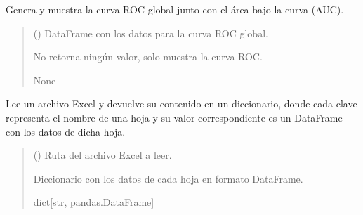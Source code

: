 \documentclass[letterpaper,10pt,spanish]{sphinxmanual}
\begin{document}
\begin{fulllineitems}
\label{\detokenize{Funciones_Visualizacion:leer_metricas.plot_roc_curves}}
\pysigstartsignatures
\pysiglinewithargsret
{}
{}
{}
\pysigstopsignatures
\sphinxAtStartPar
Genera y muestra la curva ROC global junto con el área bajo la curva (AUC).
\begin{quote}\begin{description}
\sphinxAtStartPar
{} () \textendash{} DataFrame con los datos para la curva ROC global.

\sphinxAtStartPar
No retorna ningún valor, solo muestra la curva ROC.

\sphinxAtStartPar
None

\end{description}\end{quote}

\end{fulllineitems}


\begin{fulllineitems}
\label{\detokenize{Funciones_Visualizacion:leer_metricas.read_excel_file}}
\pysigstartsignatures
\pysiglinewithargsret
{}
{}
{}
\pysigstopsignatures
\sphinxAtStartPar
Lee un archivo Excel y devuelve su contenido en un diccionario, donde cada clave 
representa el nombre de una hoja y su valor correspondiente es un DataFrame con los datos de dicha hoja.
\begin{quote}\begin{description}
\sphinxAtStartPar
{} () \textendash{} Ruta del archivo Excel a leer.

\sphinxAtStartPar
Diccionario con los datos de cada hoja en formato DataFrame.

\sphinxAtStartPar
dict{[}str, pandas.DataFrame{]}

\end{description}\end{quote}

\end{fulllineitems}
\end{document}
